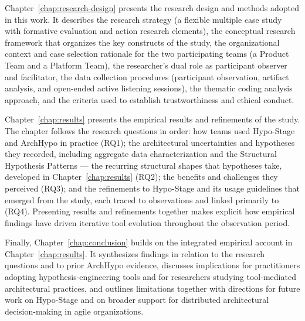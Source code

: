 Chapter~\ref{chap:research-design} presents the research design and methods adopted
in this work. It describes the research strategy (a flexible multiple case study
with formative evaluation and action research elements), the conceptual research
framework that organizes the key constructs of the study, the organizational context and
case selection rationale for the two participating teams (a Product Team and a Platform
Team), the researcher's dual role as participant observer and facilitator, the data
collection procedures (participant observation, artifact analysis, and open-ended active
listening sessions), the thematic coding analysis approach, and the criteria used to
establish trustworthiness and ethical conduct.

Chapter~\ref{chap:results} presents the empirical results and refinements of the study.
The chapter follows the research questions in order: how teams used Hypo-Stage and
ArchHypo in practice (RQ1); the architectural uncertainties and hypotheses they
recorded, including aggregate data characterization and the Structural Hypothesis
Patterns --- the recurring structural shapes that hypotheses take, developed in
Chapter~\ref{chap:results} (RQ2); the benefits and challenges they perceived (RQ3); and the refinements to
Hypo-Stage and its usage guidelines that emerged from the study, each traced to
observations and linked primarily to (RQ4). Presenting results and refinements together
makes explicit how empirical findings have driven iterative tool evolution throughout the
observation period.

Finally, Chapter~\ref{chap:conclusion} builds on the integrated empirical account in Chapter~\ref{chap:results}. 
It synthesizes findings in relation to the research questions and to prior ArchHypo evidence, discusses implications for practitioners adopting
hypothesis-engineering tools and for researchers studying tool-mediated architectural
practices, and outlines limitations together with directions for future work on Hypo-Stage and on broader
support for distributed architectural decision-making in agile organizations.
